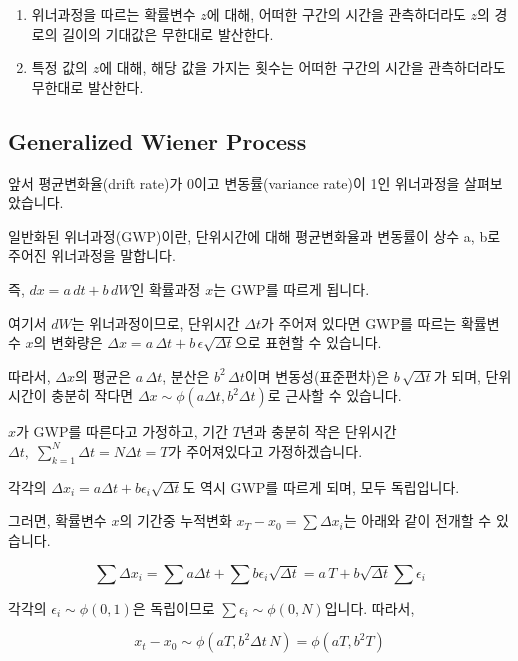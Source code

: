 \documentclass[
  letterpaper,
  DIV=11,
  numbers=noendperiod]{scrreprt}
\providecommand{\tightlist}{%
  \setlength{\itemsep}{0pt}\setlength{\parskip}{0pt}}\usepackage{longtable,booktabs,array}
\begin{document}
\begin{enumerate}
\def\labelenumi{\arabic{enumi}.}
\tightlist
\item
  위너과정을 따르는 확률변수 \(z\)에 대해, 어떠한 구간의 시간을
  관측하더라도 \(z\)의 경로의 길이의 기대값은 무한대로 발산한다.
\item
  특정 값의 \(z\)에 대해, 해당 값을 가지는 횟수는 어떠한 구간의 시간을
  관측하더라도 무한대로 발산한다.
\end{enumerate}

\subsection*{Generalized Wiener
Process}\label{generalized-wiener-process}

앞서 평균변화율(drift rate)가 0이고 변동률(variance rate)이 1인
위너과정을 살펴보았습니다.

일반화된 위너과정(GWP)이란, 단위시간에 대해 평균변화율과 변동률이 상수
a, b로 주어진 위너과정을 말합니다.

즉, \(dx=a\,dt+b\,dW\)인 확률과정 \(x\)는 GWP를 따르게 됩니다.

여기서 \(dW\)는 위너과정이므로, 단위시간 \(\Delta t\)가 주어져 있다면
GWP를 따르는 확률변수 \(x\)의 변화량은
\(\Delta x=a\,\Delta t+b\,\epsilon\sqrt{\Delta t}\)으로 표현할 수
있습니다.

따라서, \(\Delta x\)의 평균은 \(a\,\Delta t\), 분산은
\(b^2\,\Delta t\)이며 변동성(표준편차)은 \(b\,\sqrt{\Delta t}\)가 되며,
단위시간이 충분히 작다면 \(\Delta x\sim\phi(a\Delta t,b^2\Delta t)\)로
근사할 수 있습니다.

\begin{tcolorbox}[enhanced jigsaw, toprule=.15mm, breakable, left=2mm, leftrule=.75mm, opacitybacktitle=0.6, coltitle=black, rightrule=.15mm, colback=white, titlerule=0mm, bottomtitle=1mm, colframe=quarto-callout-note-color-frame, title=\textcolor{quarto-callout-note-color}{\faInfo}\hspace{0.5em}{기간 T에 대한 GWP의 분포}, toptitle=1mm, arc=.35mm, colbacktitle=quarto-callout-note-color!10!white, opacityback=0, bottomrule=.15mm]

\(x\)가 GWP를 따른다고 가정하고, 기간 \(T\)년과 충분히 작은 단위시간
\(\Delta t,\;\sum_{k=1}^N\Delta t=N\Delta t=T\)가 주어져있다고
가정하겠습니다.

각각의 \(\Delta x_i=a\Delta t+b\epsilon_i\sqrt{\Delta t}\)도 역시 GWP를
따르게 되며, 모두 독립입니다.

그러면, 확률변수 \(x\)의 기간중 누적변화 \(x_T-x_0=\sum\Delta x_i\)는
아래와 같이 전개할 수 있습니다.

\[\sum\Delta x_i=\sum a\Delta t+\sum b\epsilon_i\sqrt{\Delta t}=a\,T+b\sqrt{\Delta t}\sum \epsilon_i\]

각각의 \(\epsilon_i\sim\phi(0,1)\)은 독립이므로
\(\sum \epsilon_i\sim\phi(0,N)\)입니다. 따라서,

\[x_t-x_0\sim\phi(aT,b^2\Delta t\,N)=\phi(aT,b^2T)\]

\end{tcolorbox}
\end{document}
